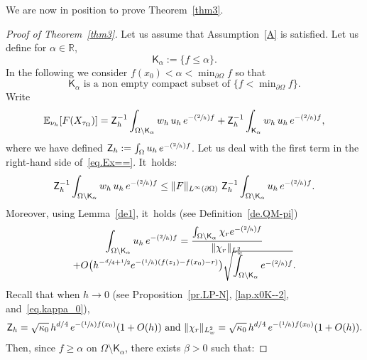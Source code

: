 \documentclass[10pt]{amsart}
\newcommand{\Psfrac}[2]{(\sfrac{#1}{#2})}
\theoremstyle{plain}
\theoremstyle{definition}
\begin{document}
We are now in position to prove Theorem~\ref{thm3}.

\begin{proof}[Proof of Theorem~\ref{thm3}]
Let us assume that Assumption~\ref{A} is satisfied.
Let us define for $\alpha \in \mathbb R$,\vspace*{-3pt}\enlargethispage{.5\baselineskip}
\[
\mathsf K_{\alpha}:=\{f\le \alpha\}.
\]
In the following we consider $f(x_0)<\alpha < \min_{\partial \Omega}f$ so that\vspace*{-1pt}
\[
\mathsf K_{\alpha} \text{ is a non empty compact subset of } \{f<\min\nolimits_{\partial \Omega}f\}.
\]
Write\vspace*{-3pt}
\begin{equation}\label{eq.Ex==}
\mathbb E_{\nu_h} [F(X_{\tau_{\Omega}})]={\mathsf Z_h^{-1}} \int_{\Omega \setminus \mathsf K_{\alpha}}w_h\,
{u}_h\, e^{-\Psfrac{2}{h}f} + {\mathsf Z_h^{-1}} \int_{\mathsf K_{\alpha}} w_h\, {u}_h\, e^{-\Psfrac{2}{h}f},
\end{equation}
where we have defined $ \mathsf Z_h:=\int_{\Omega }
{u}_h\, e^{-\Psfrac{2}{h}f}$.
Let us deal with the first term in the right-hand side of~\eqref{eq.Ex==}. It~holds:\vspace*{-3pt}
\[
{\mathsf Z_h^{-1}} \int_{\Omega \setminus \mathsf K_{\alpha}}w_h\,
{u}_h\, e^{-\Psfrac{2}{h}f} \le \Vert F\Vert _{L^\infty(\partial \Omega)}\ {\mathsf Z_h^{-1}} \int_{\Omega \setminus \mathsf K_{\alpha}}
{u}_h\, e^{-\Psfrac{2}{h}f}.
\]
Moreover, using Lemma~\ref{de1}, it~holds (see Definition~\ref{de.QM-pi})\vspace*{-5pt}
\begin{multline*}
\int_{\Omega \setminus \mathsf K_{\alpha}}
{u}_h\, e^{-\Psfrac{2}{h}f}=\frac{\int_{\Omega \setminus \mathsf K_{\alpha}} \chi_r e^{-\Psfrac{2}{h}f} }{\Vert \chi_r\Vert_{L^2_w}}\\[-8pt] +O\bigl(h^{-\sfrac d4 +\sfrac 12} e^{-\Psfrac 1h (f(z_1)-f(x_0)-r)} \bigr) \sqrt { \int_{\Omega \setminus \mathsf K_{\alpha}}
e^{-\Psfrac{2}{h}f}}.
\end{multline*}
Recall that when $h\to 0$ (see Proposition~\ref{pr.LP-N}, \eqref{lap.x0K--2}, and~\eqref{eq.kappa_0}),\vspace*{-3pt}
\[
\mathsf Z_h=\sqrt{\kappa_0}\, h^{d/4}\, e^{-\Psfrac 1h f(x_0)}(1+O(h)) \ \text{and} \ \Vert \chi_r\Vert_{L^2_w}=\sqrt{\kappa_0}\, h^{d/4}\, e^{-\Psfrac 1h f(x_0)}(1+O(h)).
\]
Then, since $f\ge \alpha$ on $\Omega \setminus \mathsf K_{\alpha}$, there exists $\beta >0$ such that:\vspace*{-3pt}

\end{proof}
\end{document}
